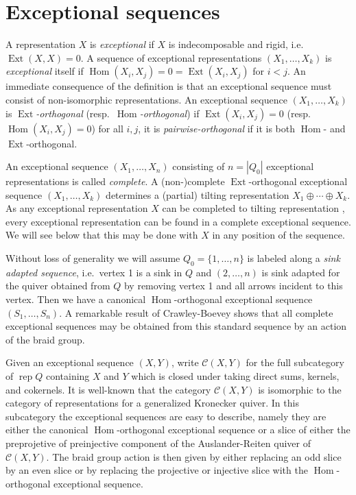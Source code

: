 \documentclass{amsart}
\numberwithin{equation}{section}
\newcommand{\cC}{\mathcal{C}}
\newcommand{\Ext}{\operatorname{Ext}}
\newcommand{\Hom}{\operatorname{Hom}}
\newcommand{\rep}{\operatorname{rep}}
\begin{document}

\section{Exceptional sequences}

A representation $X$ is \emph{exceptional} if $X$ is indecomposable and rigid, i.e.\ $\Ext(X,X)=0$.
A sequence of exceptional representations $(X_1,\ldots,X_k)$ is \emph{exceptional} itself if $\Hom(X_i,X_j)=0=\Ext(X_i,X_j)$ for $i<j$.
An immediate consequence of the definition is that an exceptional sequence must consist of non-isomorphic representations. 
An exceptional sequence $(X_1,\ldots,X_k)$ is \emph{$\Ext$-orthogonal} (resp.\ \emph{$\Hom$-orthogonal}) if $\Ext(X_i,X_j)=0$ (resp. $\Hom(X_i,X_j)=0$) for all $i,j$, it is \emph{pairwise-orthogonal} if it is both $\Hom$- and $\Ext$-orthogonal.

An exceptional sequence $(X_1,\ldots,X_n)$ consisting of $n=|Q_0|$ exceptional representations is called \emph{complete}.
A (non-)complete $\Ext$-orthogonal exceptional sequence $(X_1,\ldots,X_k)$ determines a (partial) tilting representation $X_1\oplus\cdots\oplus X_k$. 
As any exceptional representation $X$ can be completed to tilting representation \cite{???}, every exceptional representation can be found in a complete exceptional sequence.
We will see below that this may be done with $X$ in any position of the sequence. 

Without loss of generality we will assume $Q_0=\{1,\ldots,n\}$ is labeled along a \emph{sink adapted sequence}, i.e.\ vertex 1 is a sink in $Q$ and $(2,\ldots,n)$ is sink adapted for the quiver obtained from $Q$ by removing vertex 1 and all arrows incident to this vertex.
Then we have a canonical $\Hom$-orthogonal exceptional sequence $(S_1,\ldots,S_n)$.
A remarkable result of Crawley-Boevey shows that all complete exceptional sequences may be obtained from this standard sequence by an action of the braid group.

Given an exceptional sequence $(X,Y)$, write $\cC(X,Y)$ for the full subcategory of $\rep Q$ containing $X$ and $Y$ which is closed under taking direct sums, kernels, and cokernels.
It is well-known \cite{???} that the category $\cC(X,Y)$ is isomorphic to the category of representations for a generalized Kronecker quiver.
In this subcategory the exceptional sequences are easy to describe, namely they are either the canonical $\Hom$-orthogonal exceptional sequence or a slice of either the preprojetive of preinjective component of the Auslander-Reiten quiver of $\cC(X,Y)$.
The braid group action is then given by either replacing an odd slice by an even slice or by replacing the projective or injective slice with the $\Hom$-orthogonal exceptional sequence.
\end{document}
